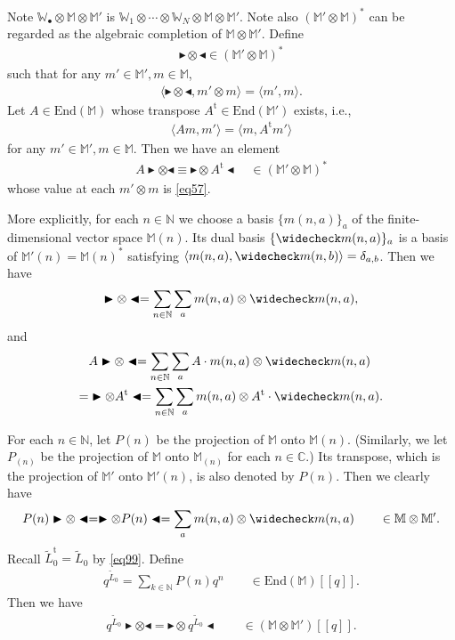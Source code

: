 \documentclass[12pt,a4paper,notitlepage]{article}
\theoremstyle{definition}
\theoremstyle{plain}
\newcommand{\wtd}{\widetilde}
\newcommand{\wch}{\widecheck}
\newcommand{\tr}{\mathrm{t}} %
\newcommand{\End}{\mathrm{End}} %
\newcommand{\bk}[1]{\langle {#1}\rangle}
\newcommand{\blt}{\bullet}
\newcommand{\Wbb}{\mathbb W}
\newcommand{\Mbb}{\mathbb M}
\newcommand{\Cbb}{\mathbb C}
\newcommand{\Nbb}{\mathbb N}
\newcommand{\btl}{\blacktriangleleft}
\newcommand{\btr}{\blacktriangleright}
\numberwithin{equation}{section}
\begin{document}
Note $\Wbb_\blt\otimes\Mbb\otimes\Mbb'$ is $\Wbb_1\otimes\cdots\otimes \Wbb_N\otimes\Mbb\otimes\Mbb'$. Note also $(\Mbb'\otimes\Mbb)^*$ can be regarded as the algebraic completion of $\Mbb\otimes\Mbb'$. Define \index{zzz@$\btr\otimes\btl$}
\begin{align*}
\btr\otimes\btl\in (\Mbb'\otimes\Mbb)^*
\end{align*}
such that for any $m'\in\Mbb',m\in\Mbb$,
\begin{align}
\bk{\btr\otimes\btl,m'\otimes m}=\bk{m',m}.\label{eq95}
\end{align}
Let $A\in\End(\Mbb)$ whose transpose $A^\tr\in\End(\Mbb')$ exists, i.e.,
\begin{align}
\bk{Am,m'}=\bk{m,A^\tr m'}\label{eq57}
\end{align}
for any $m'\in\Mbb',m\in\Mbb$. Then we have an element
\begin{align}
A\btr\otimes\btl\equiv \btr\otimes A^\tr\btl\quad\in (\Mbb'\otimes\Mbb)^*\label{eq58}
\end{align}
whose value at each $m'\otimes m$ is \eqref{eq57}.


More explicitly, for each $n\in\Nbb$ we choose a basis $\{m(n,a)\}_a$ of the finite-dimensional vector space $\Mbb(n)$. Its dual basis $\{\wch m(n,a)\}_a$ is a basis of $\Mbb'(n)=\Mbb(n)^*$ satisfying $\bk{m(n,a),\wch m(n,b)}=\delta_{a,b}$. Then we have
\begin{gather*}
\btr\otimes\btl=\sum_{n\in\Nbb}\sum_am(n,a)\otimes\wch m(n,a),
\end{gather*}
and
\begin{align*}
&A\btr\otimes\btl=\sum_{n\in\Nbb}\sum_a A\cdot m(n,a)\otimes\wch m(n,a)\\
=& \btr\otimes A^\tr\btl=\sum_{n\in\Nbb}\sum_am(n,a)\otimes A^\tr\cdot \wch m(n,a).
\end{align*}

For each $n\in\Nbb$, let $P(n)$ be the projection of $\Mbb$ onto $\Mbb(n)$. (Similarly, we let $P_{(n)}$ be the projection of $\Mbb$ onto $\Mbb_{(n)}$ for each $n\in\Cbb$.)  Its transpose, which is the projection of $\Mbb'$ onto $\Mbb'(n)$, is also denoted by $P(n)$. Then we clearly have
\begin{align*}
P(n)\btr\otimes\btl=\btr\otimes P(n)\btl=\sum_am(n,a)\otimes\wch m(n,a)\qquad\in\Mbb\otimes\Mbb'.
\end{align*}
Recall $\wtd L_0^\tr=\wtd L_0$ by \eqref{eq99}. Define
\begin{align*}
q^{\wtd L_0}=\sum_{k\in\Nbb}P(n)q^n\qquad\in\End(\Mbb)[[q]].
\end{align*} 
Then we have
\begin{align}
q^{\wtd L_0}\btr\otimes\btl=\btr\otimes q^{\wtd L_0} \btl\qquad \in (\Mbb\otimes\Mbb')[[q]].\label{eq59}
\end{align}
\end{document}
